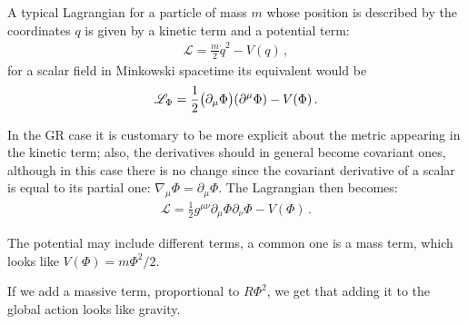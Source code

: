 \documentclass[main.tex]{subfiles}
\begin{document}
A typical Lagrangian for a particle of mass \(m\) whose position is described by the coordinates \(q\) is given by a kinetic term and a potential term:
%
\begin{align}
  \mathscr{L}  = \frac{m}{2} \dot{q}^2 - V(q)
\,,
\end{align}
%
for a scalar field in Minkowski spacetime its equivalent would be 
%
\begin{align}
\mathscr{L}_\Phi  = \frac{1}{2} \qty(\partial_{\mu } \Phi ) \qty(\partial^{\mu } \Phi )
-V(\Phi )
\,.
\end{align}
%

In the GR case it is customary to be more explicit about the metric appearing in the kinetic term; also, the derivatives should in general become covariant ones, although in this case there is no change since the covariant derivative of a scalar is equal to its partial one: \(\nabla_\mu \Phi  = \partial_{\mu } \Phi \). 
The Lagrangian then becomes: 
%
\begin{align}
\mathscr{L} = \frac{1}{2} g^{\mu \nu } \partial_{\mu } \Phi \partial_{\nu } \Phi - V(\Phi )
\,.
\end{align}

The potential may include different terms, a common one is a mass term, which looks like \(V(\Phi ) = m \Phi^2 / 2\). 

If we add a massive term, proportional to \(R \Phi^2\), we get that adding it to the global action looks like gravity.
\end{document}

